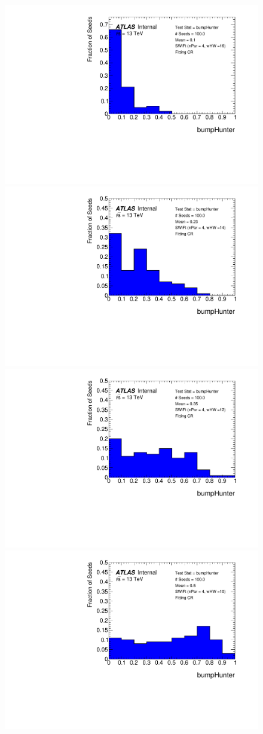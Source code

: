 \begin{figure}[!htb]
\captionsetup[subfigure]{aboveskip=0pt,justification=centering}
\centering
{} {
  \includegraphics[width=0.45\linewidth, angle=0]{figs/Dibjet/LowMass/FitStudy/pVal_bumpHunter_corrFitCR_4para_low16_high16.pdf}
}                                                                                              
 {                                                    
  \includegraphics[width=0.45\linewidth, angle=0]{figs/Dibjet/LowMass/FitStudy/pVal_bumpHunter_corrFitCR_4para_low14_high14.pdf}
}                                                                                              
 {                                                    
  \includegraphics[width=0.45\linewidth, angle=0]{figs/Dibjet/LowMass/FitStudy/pVal_bumpHunter_corrFitCR_4para_low12_high12.pdf}
}                                                                                              
 {                                                    
  \includegraphics[width=0.45\linewidth, angle=0]{figs/Dibjet/LowMass/FitStudy/pVal_bumpHunter_corrFitCR_4para_low10_high10.pdf}
}
\end{figure}
